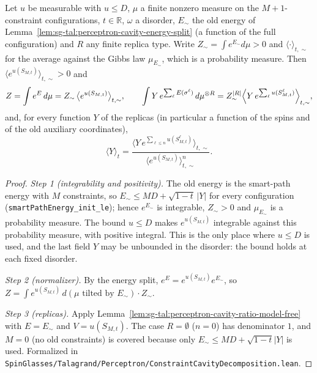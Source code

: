 \begin{proposition}\label{prop:sg-tal:perceptron-cavity-ratio}
  \leanok
Let $u$ be measurable with $u\le D$, $\mu$ a finite nonzero measure on the $M+1$-constraint configurations, $t\in\mathbb R$, $\omega$ a disorder,
$E_{\sim}$ the old energy of Lemma~\ref{lem:sg-tal:perceptron-cavity-energy-split} (a function of the full configuration) and $R$ any finite replica
type. Write $Z_\sim=\int e^{E_\sim}d\mu>0$ and $\langle\cdot\rangle_{t,\sim}$ for the average against the Gibbs law $\mu_{E_\sim}$, which is a
probability measure. Then $\langle e^{u(S_{M,t})}\rangle_{t,\sim}>0$ and
\[
 Z=\int e^{E}\,d\mu=Z_\sim\,\bigl\langle e^{u(S_{M,t})}\bigr\rangle_{t,\sim},\qquad
 \int Y\,e^{\sum_\ell E(\sigma^\ell)}\,d\mu^{\otimes R}=Z_\sim^{|R|}\Bigl\langle Y\,e^{\sum_{\ell}u(S^\ell_{M,t})}\Bigr\rangle_{t,\sim},
\]
and, for every function $Y$ of the replicas (in particular a function of the spins and of the old auxiliary coordinates),
\[
 \langle Y\rangle_t=\frac{\bigl\langle Y\,e^{\sum_{\ell\le n}u(S^\ell_{M,t})}\bigr\rangle_{t,\sim}}{\bigl\langle e^{u(S_{M,t})}\bigr\rangle_{t,\sim}^{n}} .
\]
\end{proposition}
\begin{proof}
  \leanok
\emph{Step 1 (integrability and positivity).} The old energy is the smart-path energy with $M$ constraints, so $E_\sim\le MD+\sqrt{1-t}\,|Y|$
for every configuration (\texttt{smartPathEnergy\_init\_le}); hence $e^{E_\sim}$ is integrable, $Z_\sim>0$ and $\mu_{E_\sim}$ is a probability measure.
The bound $u\le D$ makes $e^{u(S_{M,t})}$ integrable against this probability measure, with positive integral. This is the only place where
$u\le D$ is used, and the last field $Y$ may be unbounded in the disorder: the bound holds at each fixed disorder.

\emph{Step 2 (normalizer).} By the energy split, $e^{E}=e^{u(S_{M,t})}e^{E_\sim}$, so $Z=\int e^{u(S_{M,t})}\,d(\mu\text{ tilted by }E_\sim)\cdot Z_\sim$.

\emph{Step 3 (replicas).} Apply Lemma~\ref{lem:sg-tal:perceptron-cavity-ratio-model-free} with $E=E_\sim$ and $V=u(S_{M,t})$. The case $R=\emptyset$
($n=0$) has denominator $1$, and $M=0$ (no old constraints) is covered because only $E_\sim\le MD+\sqrt{1-t}|Y|$ is used.
Formalized in \texttt{SpinGlasses/Talagrand/Perceptron/ConstraintCavityDecomposition.lean}.
\end{proof}

